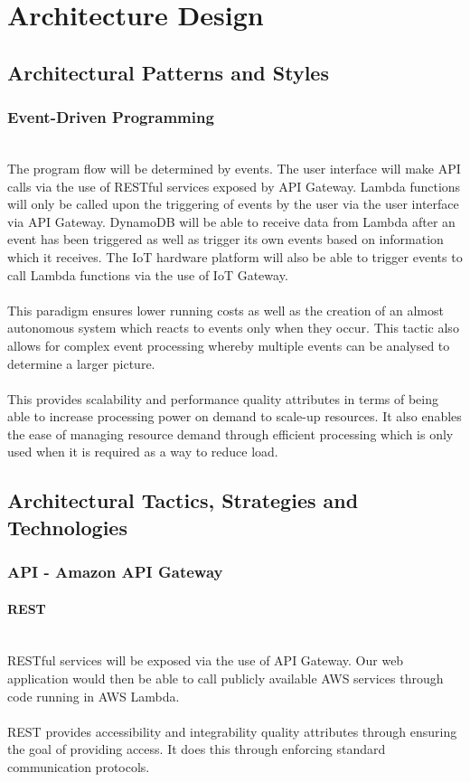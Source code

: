 \documentclass{article}
\begin{document}
\cleardoublepage

\section{Architecture Design}
\subsection{Architectural Patterns and Styles}
	\subsubsection{Event-Driven Programming}\mbox{}\\
	The program flow will be determined by events. The user interface will make API calls via the use of RESTful services exposed by API Gateway. Lambda functions will only be called upon the triggering of events by the user via the user interface via API Gateway. DynamoDB will be able to receive data from Lambda after an event has been triggered as well as trigger its own events based on information which it receives. The IoT hardware platform will also be able to trigger events to call Lambda functions via the use of IoT Gateway.\\\\
	This paradigm ensures lower running costs as well as the creation of an almost autonomous system which reacts to events only when they occur. This tactic also allows for complex event processing whereby multiple events can be analysed to determine a larger picture.\\\\
	This provides scalability and performance quality attributes in terms of being able to increase processing power on demand to scale-up resources. It also enables the ease of managing resource demand through efficient processing which is only used when it is required as a way to reduce load.
\subsection{Architectural Tactics, Strategies and Technologies}
	\subsubsection{API - Amazon API Gateway}
		\paragraph{REST}\mbox{}\\
		RESTful services will be exposed via the use of API Gateway. Our web application would then be able to call publicly available AWS services through code running in AWS Lambda.\\\\
		REST provides accessibility and integrability quality attributes through ensuring the goal of providing access. It does this through enforcing standard communication protocols.
\end{document}
